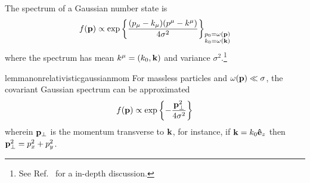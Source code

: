\begin{definition}
	The spectrum of a Gaussian number state is
	\begin{equation}
		f(\vb{p})
		\propto
		\exp\left\{
			\frac{(p_\mu-k_\mu)(p^\mu-k^\mu)}{4\sigma^2}
		\right\}_{\substack{p_0=\omega(\vb{p})\\k_0=\omega(\vb{k})}}
		\label{eq:covariant_gaussian_spectrum}
	\end{equation}
	where the spectrum has mean $k^\mu=(k_0,\vb{k})$ and variance $\sigma^2$.\footnote{See Ref.~\cite{Naumov2013,Naumov2009} for a in-depth discussion.}
\end{definition}
\begin{restatable}{lemma}{nonrelativisticgaussianmom}\label{thm:non_relativistic_gaussian_momentum}
	For massless particles and $\omega(\vb{p})\ll\sigma$, the covariant Gaussian spectrum can be approximated
	\begin{equation}
		f(\vb{p})
		\propto
		\exp\left\{
			-
			\frac{
				\vb{p}_\perp^2
			}{4\sigma^2}
		\right\}
	\end{equation}
	wherein $\vb{p}_\perp$ is the momentum transverse to $\vb{k}$, for instance, if $\vb{k}=k_0\vu{e}_z$ then $\vb{p}_\perp^2=p_x^2+p_y^2$.
\end{restatable}